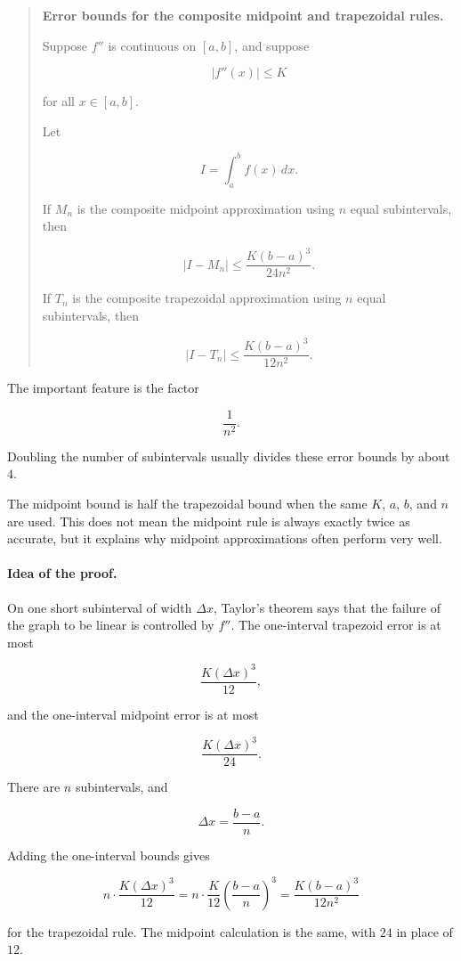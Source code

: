 \begin{quote}
\textbf{Error bounds for the composite midpoint and trapezoidal rules.}

Suppose \(f''\) is continuous on \([a,b]\), and suppose

\[
|f''(x)|\le K
\]

for all \(x\in[a,b]\).

Let

\[
I=\int_a^b f(x)\,dx.
\]

If \(M_n\) is the composite midpoint approximation using \(n\) equal subintervals, then

\[
\boxed{
|I-M_n|\le \frac{K(b-a)^3}{24n^2}.
}
\]

If \(T_n\) is the composite trapezoidal approximation using \(n\) equal subintervals, then

\[
\boxed{
|I-T_n|\le \frac{K(b-a)^3}{12n^2}.
}
\]
\end{quote}

The important feature is the factor

\[
\frac{1}{n^2}.
\]

Doubling the number of subintervals usually divides these error bounds by about \(4\).

The midpoint bound is half the trapezoidal bound when the same \(K\), \(a\), \(b\), and
\(n\) are used.  This does not mean the midpoint rule is always exactly twice as accurate,
but it explains why midpoint approximations often perform very well.

\paragraph{Idea of the proof.}
On one short subinterval of width \(\Delta x\), Taylor's theorem says that the failure of
the graph to be linear is controlled by \(f''\).  The one-interval trapezoid error is at most

\[
\frac{K(\Delta x)^3}{12},
\]

and the one-interval midpoint error is at most

\[
\frac{K(\Delta x)^3}{24}.
\]

There are \(n\) subintervals, and

\[
\Delta x=\frac{b-a}{n}.
\]

Adding the one-interval bounds gives

\[
n\cdot \frac{K(\Delta x)^3}{12}
=
n\cdot \frac{K}{12}\left(\frac{b-a}{n}\right)^3
=
\frac{K(b-a)^3}{12n^2}
\]

for the trapezoidal rule.  The midpoint calculation is the same, with \(24\) in place of
\(12\).

